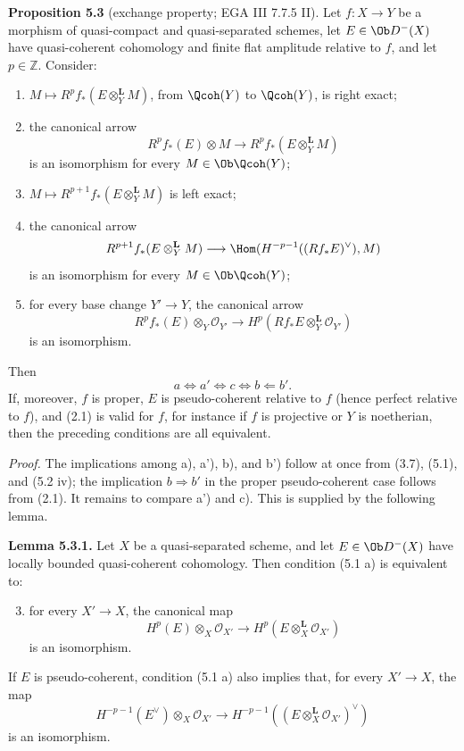 \documentclass[11pt]{article}
\begin{document}
\textbf{Proposition 5.3} (exchange property; EGA III 7.7.5 II). Let \(f:X\to Y\) be a morphism of quasi-compact and quasi-separated schemes, let \(E\in\Ob D^{-}(X)\) have quasi-coherent cohomology and finite flat amplitude relative to \(f\), and let \(p\in\mathbb Z\). Consider:
\begin{enumerate}[label=\alph*)]
\item \(M\mapsto R^pf_*(E\otimes_Y^{\mathbf L}M)\), from \(\Qcoh(Y)\) to \(\Qcoh(Y)\), is right exact;
\item[\(\mathrm a'\)] the canonical arrow
\[
 R^pf_*(E)\otimes M
 \longrightarrow
 R^pf_*(E\otimes_Y^{\mathbf L}M)
\]
is an isomorphism for every \(M\in\Ob\Qcoh(Y)\);
\item[\(\mathrm b\)] \(M\mapsto R^{p+1}f_*(E\otimes_Y^{\mathbf L}M)\) is left exact;
\item[\(\mathrm b'\)] the canonical arrow
\[
 R^{p+1}f_*(E\otimes_Y^{\mathbf L}M)
 \longrightarrow
 \Hom(H^{-p-1}((Rf_*E)^{\vee}),M)
\]
is an isomorphism for every \(M\in\Ob\Qcoh(Y)\);
\item[\(\mathrm c\)] for every base change \(Y'\to Y\), the canonical arrow
\[
 R^pf_*(E)\otimes_Y\mathcal O_{Y'}
 \longrightarrow
 H^p(Rf_*E\otimes_Y^{\mathbf L}\mathcal O_{Y'})
\]
is an isomorphism.
\end{enumerate}
Then
\[
 a\Longleftrightarrow a'\Longleftrightarrow c\Longleftrightarrow b\Longleftarrow b'.
\]
If, moreover, \(f\) is proper, \(E\) is pseudo-coherent relative to \(f\) (hence perfect relative to \(f\)), and (2.1) is valid for \(f\), for instance if \(f\) is projective or \(Y\) is noetherian, then the preceding conditions are all equivalent.

\emph{Proof.} The implications among a), a'), b), and b') follow at once from (3.7), (5.1), and (5.2 iv); the implication \(b\Rightarrow b'\) in the proper pseudo-coherent case follows from (2.1). It remains to compare a') and c). This is supplied by the following lemma.

\textbf{Lemma 5.3.1.} Let \(X\) be a quasi-separated scheme, and let \(E\in\Ob D^{-}(X)\) have locally bounded quasi-coherent cohomology. Then condition (5.1 a) is equivalent to:
\begin{enumerate}[label=\alph*)]
\setcounter{enumi}{2}
\item for every \(X'\to X\), the canonical map
\[
 H^p(E)\otimes_X\mathcal O_{X'}
 \longrightarrow
 H^p(E\otimes_X^{\mathbf L}\mathcal O_{X'})
\]
is an isomorphism.
\end{enumerate}
If \(E\) is pseudo-coherent, condition (5.1 a) also implies that, for every \(X'\to X\), the map
\[
 H^{-p-1}(E^{\vee})\otimes_X\mathcal O_{X'}
 \longrightarrow
 H^{-p-1}((E\otimes_X^{\mathbf L}\mathcal O_{X'})^{\vee})
\tag{5.3.1.1}
\]
is an isomorphism.
\end{document}
